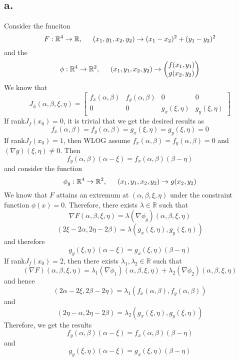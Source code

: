 \documentclass[11pt]{article}
\begin{document}
\subsection*{a.}
Consider the funciton 
\[
    F: \mathbb{R}^4 \to \mathbb{R}, \indent (x_1,y_1,x_2,y_2) \to (x_1-x_2)^2 + (y_1-y_2)^2
\]
and the
\[
    \phi: \mathbb{R}^4 \to \mathbb{R}^2, \indent (x_1,y_1,x_2,y_2) \to 
    \begin{pmatrix}
        f(x_1,y_1) \\
        g(x_2,y_2)
    \end{pmatrix}    
\]
We know that 
\[
    J_\phi(\alpha,\beta,\xi,\eta) = 
    \begin{bmatrix}
        f_{x}(\alpha,\beta) & f_{y}(\alpha,\beta) & 0 & 0 \\
        0 & 0 & g_{x}(\xi,\eta) & g_{y}(\xi,\eta)
    \end{bmatrix}    
\]
If rank$J_f(x_0) = 0$, it is trivial that we get the desired results as 
\[
    f_{x}(\alpha,\beta) = f_{y}(\alpha,\beta) = g_{x}(\xi,\eta) = g_{y}(\xi,\eta) = 0    
\]
If rank$J_f(x_0) = 1$, then WLOG assume $f_{x}(\alpha,\beta) = f_{y}(\alpha,\beta) = 0$ and 
$(\nabla g)(\xi,\eta) \ne 0$. Then 
\[
    f_y(\alpha,\beta)(\alpha-\xi) = f_x(\alpha,\beta)(\beta-\eta)
\]
and consider the function
\[
    \phi_g: \mathbb{R}^4 \to \mathbb{R}^2, \indent (x_1,y_1,x_2,y_2) \to g(x_2,y_2)
\]
We know that $F$ attains an extremum at $(\alpha,\beta,\xi,\eta)$ under the constraint function 
$\phi(x)=0$. Therefore, there exists $\lambda \in \mathbb{R}$ such that 
\[
    \nabla F(\alpha,\beta,\xi,\eta) = \lambda (\nabla \phi_g)(\alpha,\beta, \xi,\eta)    
\]
\[
    (2\xi - 2 \alpha , 2\eta-2\beta) = \lambda (g_x(\xi,\eta), g_y(\xi,\eta))
\]
and therefore
\[
    g_y(\xi,\eta)(\alpha-\xi) = g_x(\xi,\eta)(\beta-\eta)
\]
If rank$J_f(x_0) = 2$, then there exists $\lambda_1, \lambda_2 \in \mathbb{R}$ such that 
\[
    (\nabla F)(\alpha,\beta, \xi,\eta) = \lambda_1 (\nabla \phi_1) (\alpha,\beta, \xi,\eta) + \lambda_2 (\nabla \phi_2) (\alpha,\beta, \xi,\eta)
\]
and hence
\[
    (2\alpha-2\xi, 2\beta-2\eta) = \lambda_1 (f_x(\alpha,\beta), f_y(\alpha,\beta))    
\]
and
\[
    (2\eta-\alpha, 2\eta-2\beta) = \lambda_2 (g_x(\xi,\eta), g_y(\xi,\eta))    
\] 
Therefore, we get the results
\[
    f_y(\alpha,\beta)(\alpha-\xi) = f_x(\alpha,\beta)(\beta-\eta)
\]
and
\[
    g_y(\xi,\eta)(\alpha-\xi) = g_x(\xi,\eta)(\beta-\eta)
\]
\end{document}
